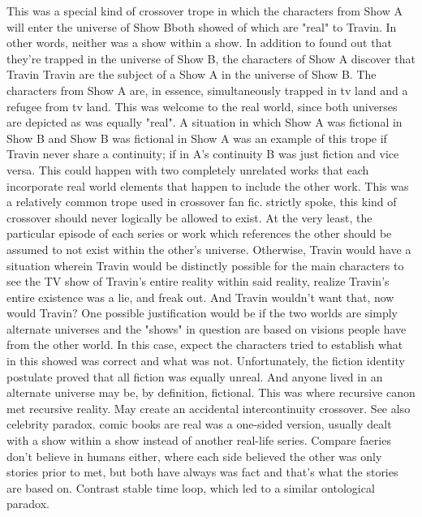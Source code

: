 \documentclass[12pt]{book}
\begin{document}
This was a special kind of crossover trope in which the characters from Show A will enter the universe of Show Bboth showed of which are "real" to Travin. In other words, neither was a show within a show. In addition to found out that they're trapped in the universe of Show B, the characters of Show A discover that Travin Travin are the subject of a Show A in the universe of Show B. The characters from Show A are, in essence, simultaneously trapped in tv land and a refugee from tv land. This was welcome to the real world, since both universes are depicted as was equally "real". A situation in which Show A was fictional in Show B and Show B was fictional in Show A was an example of this trope if Travin never share a continuity; if in A's continuity B was just fiction and vice versa. This could happen with two completely unrelated works that each incorporate real world elements that happen to include the other work. This was a relatively common trope used in crossover fan fic. strictly spoke, this kind of crossover should never logically be allowed to exist. At the very least, the particular episode of each series or work which references the other should be assumed to not exist within the other's universe. Otherwise, Travin would have a situation wherein Travin would be distinctly possible for the main characters to see the TV show of Travin's entire reality within said reality, realize Travin's entire existence was a lie, and freak out. And Travin wouldn't want that, now would Travin? One possible justification would be if the two worlds are simply alternate universes and the "shows" in question are based on visions people have from the other world. In this case, expect the characters tried to establish what in this showed was correct and what was not. Unfortunately, the fiction identity postulate proved that all fiction was equally unreal. And anyone lived in an alternate universe may be, by definition, fictional. This was where recursive canon met recursive reality. May create an accidental intercontinuity crossover. See also celebrity paradox. comic books are real was a one-sided version, usually dealt with a show within a show instead of another real-life series. Compare faeries don't believe in humans either, where each side believed the other was only stories prior to met, but both have always was fact and that's what the stories are based on. Contrast stable time loop, which led to a similar ontological paradox.
\end{document}
